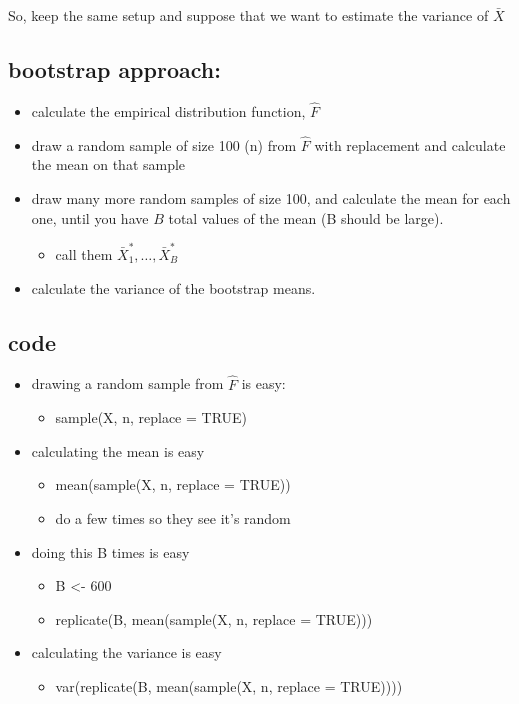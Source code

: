     So, keep the same setup and suppose that we want to estimate the
    variance of $\bar X$
\subsection{bootstrap approach:}
\label{sec-1-1}

\begin{itemize}
\item calculate the empirical distribution function, $\hat F$
\item draw a random sample of size 100 (n) from $\hat F$ with
         replacement and calculate the mean on that sample
\item draw many more random samples of size 100, and calculate the
         mean for each one, until you have $B$ total values of the mean
         (B should be large).
\begin{itemize}
\item call them $\bar X_1^*,\dots, \bar X_B^*$
\end{itemize}
\item calculate the variance of the bootstrap means.
\end{itemize}
\subsection{code}
\label{sec-1-2}

\begin{itemize}
\item drawing a random sample from $\hat F$ is easy:
\begin{itemize}
\item sample(X, n, replace = TRUE)
\end{itemize}
\item calculating the mean is easy
\begin{itemize}
\item mean(sample(X, n, replace = TRUE))
\item do a few times so they see it's random
\end{itemize}
\item doing this B times is easy
\begin{itemize}
\item B <- 600
\item replicate(B, mean(sample(X, n, replace = TRUE)))
\end{itemize}
\item calculating the variance is easy
\begin{itemize}
\item var(replicate(B, mean(sample(X, n, replace = TRUE))))
\end{itemize}
\end{itemize}
